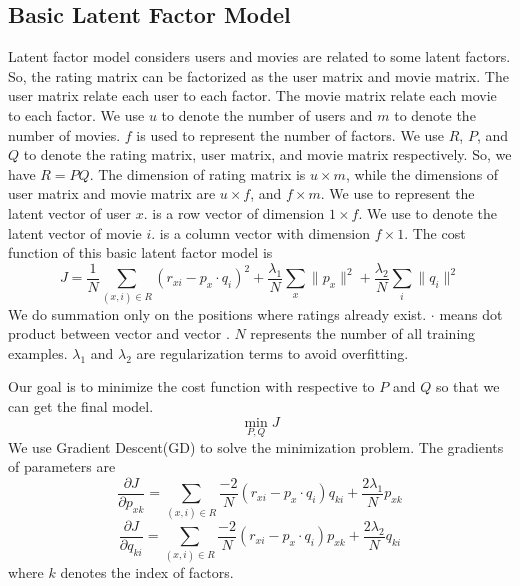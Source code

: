 \documentclass[sigconf]{acmart}
\begin{document}
\subsection{Basic Latent Factor Model}
\item{ Latent factor model considers users and movies are related to some latent factors. So, the rating matrix can be factorized as the user matrix and movie matrix. The user matrix relate each user to each factor. The movie matrix relate each movie to each factor. We use $u$ to denote the number of users and $m$ to denote the number of movies. $f$ is used to represent the number of factors. We use $R$, $P$, and $Q$ to denote the rating matrix, user matrix, and movie matrix respectively. So, we have $R=PQ$. The dimension of rating matrix is $u \times m$, while the dimensions of user matrix and movie matrix are $u \times f$, and $f \times m$. We use  to represent the latent vector of user $x$.  is a row vector of dimension $1 \times f$. We use  to denote the latent vector of movie $i$.  is a column vector with dimension $f \times 1$. The cost function of this basic latent factor model is
\begin{equation}
    J = \frac{1}{N} \sum_{(x,i) \in R} (r_{xi} - p_x \cdot q_i)^2  + \frac{\lambda_1}{N} \sum_x \| p_x \|^2 + \frac{\lambda_2}{N} \sum_i \| q_i \|^2
\end{equation}
We do summation only on the positions where ratings already exist. $\cdot$ means dot product between vector  and vector . $N$ represents the number of all training examples. $\lambda_1$ and $\lambda_2$ are regularization terms to avoid overfitting.

Our goal is to minimize the cost function with respective to $P$ and $Q$ so that we can get the final model.
\begin{equation}
    \min_{P,Q} J
\end{equation}
We use Gradient Descent(GD) to solve the minimization problem. The gradients of parameters are
\begin{equation}
    \frac{\partial J}{\partial p_{xk}} = \sum_{(x,i) \in R} \frac{-2}{N} (r_{xi} - p_x \cdot q_i) q_{ki} + \frac{2\lambda_1}{N} p_{xk}
\end{equation}
\begin{equation}
    \frac{\partial J}{\partial q_{ki}} = \sum_{(x,i) \in R} \frac{-2}{N} (r_{xi} - p_x \cdot q_i) p_{xk} + \frac{2\lambda_2}{N} q_{ki}
\end{equation}
where $k$ denotes the index of factors.

}
\end{document}
